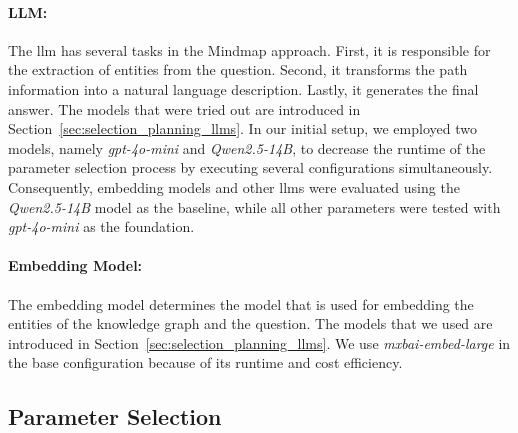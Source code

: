 \paragraph{LLM:} The \gls{llm} has several tasks in the Mindmap approach. First, it is responsible for the extraction of entities from the question. Second, it transforms the path information into a natural language description. Lastly, it generates the final answer. The models that were tried out are introduced in Section~\ref{sec:selection_planning_llms}. In our initial setup, we employed two models, namely \emph{gpt-4o-mini} and \emph{Qwen2.5-14B}, to decrease the runtime of the parameter selection process by executing several configurations simultaneously. Consequently, embedding models and other \glspl{llm} were evaluated using the \emph{Qwen2.5-14B} model as the baseline, while all other parameters were tested with \emph{gpt-4o-mini} as the foundation.

\paragraph{Embedding Model:} The embedding model determines the model that is used for embedding the entities of the knowledge graph and the question. The models that we used are introduced in Section~\ref{sec:selection_planning_llms}. We use \emph{mxbai-embed-large} in the base configuration because of its runtime and cost efficiency.


\subsection{Parameter Selection}

